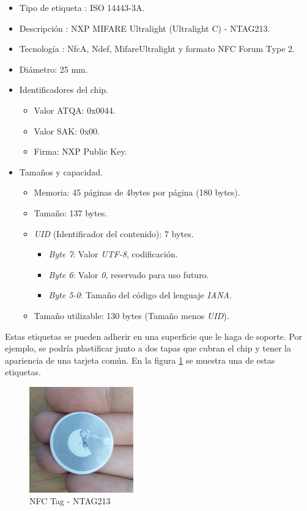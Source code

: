 \documentclass[../PFC.tex]{subfiles}
\begin{document}
\begin{itemize}
\item{Tipo de etiqueta : ISO 14443-3A.}
\item{Descripción : NXP MIFARE Ultralight (Ultralight C) - NTAG213.}
\item{Tecnología : NfcA, Ndef, MifareUltralight y formato NFC Forum Type 2.}
\item{Diámetro: 25 mm.}
\item{Identificadores del chip.}
	\begin{itemize}
	\item{Valor ATQA: 0x0044.}
	\item{Valor SAK: 0x00.}
	\item{Firma: NXP Public Key.}
	\end{itemize}
\item{Tamaños y capacidad.}
	\begin{itemize}
	\item{Memoria: 45 páginas de 4bytes por página (180 bytes).}
	\item{Tamaño: 137 bytes.}
	\item{\textit{UID} (Identificador del contenido): 7 bytes\cite{nfcSpecifications}.}
		\begin{itemize}
		\item{\textit{Byte 7}: Valor \textit{UTF-8}, codificación.}
		\item{\textit{Byte 6}: Valor \textit{0}, reservado para uso futuro.}
		\item{\textit{Byte 5-0}: Tamaño del código del lenguaje \textit{IANA}.}
		\end{itemize}	
	\item{Tamaño utilizable: 130 bytes (Tamaño menos \textit{UID}).}	
	\end{itemize}
\end{itemize}

Estas etiquetas se pueden adherir en una superficie que le haga de soporte. Por ejemplo, se podría plastificar junto a dos tapas que cubran el chip y tener la apariencia de una tarjeta común. En la figura \ref{img:nfctag} se muestra una de estas etiquetas. 

\begin{figure}[H]
  \centering
  \includegraphics[width=0.4\textwidth]{./img/nfctag}
  \caption{NFC Tag - NTAG213}
  \label{img:nfctag}
\end{figure}
\end{document}
